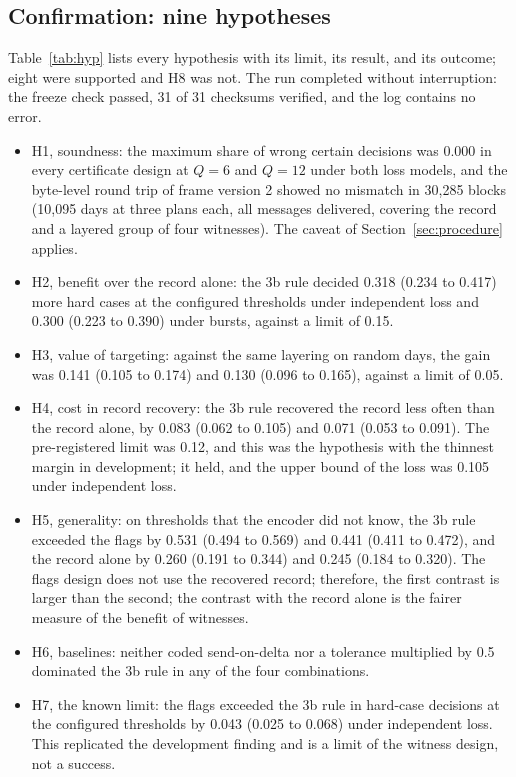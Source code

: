 \subsection{Confirmation: nine hypotheses}
\label{sec:confres}
Table~\ref{tab:hyp} lists every hypothesis with its limit, its result, and its outcome; eight were supported and H8 was not. The run completed without interruption: the freeze check passed, 31 of 31 checksums verified, and the log contains no error.
\begin{itemize}
  \item H1, soundness: the maximum share of wrong certain decisions was 0.000 in every certificate design at $Q = 6$ and $Q = 12$ under both loss models, and the byte-level round trip of frame version 2 showed no mismatch in 30,285 blocks (10,095 days at three plans each, all messages delivered, covering the record and a layered group of four witnesses). The caveat of Section~\ref{sec:procedure} applies.
  \item H2, benefit over the record alone: the 3b rule decided 0.318 (0.234 to 0.417) more hard cases at the configured thresholds under independent loss and 0.300 (0.223 to 0.390) under bursts, against a limit of 0.15.
  \item H3, value of targeting: against the same layering on random days, the gain was 0.141 (0.105 to 0.174) and 0.130 (0.096 to 0.165), against a limit of 0.05.
  \item H4, cost in record recovery: the 3b rule recovered the record less often than the record alone, by 0.083 (0.062 to 0.105) and 0.071 (0.053 to 0.091). The pre-registered limit was 0.12, and this was the hypothesis with the thinnest margin in development; it held, and the upper bound of the loss was 0.105 under independent loss.
  \item H5, generality: on thresholds that the encoder did not know, the 3b rule exceeded the flags by 0.531 (0.494 to 0.569) and 0.441 (0.411 to 0.472), and the record alone by 0.260 (0.191 to 0.344) and 0.245 (0.184 to 0.320). The flags design does not use the recovered record; therefore, the first contrast is larger than the second; the contrast with the record alone is the fairer measure of the benefit of witnesses.
  \item H6, baselines: neither coded send-on-delta nor a tolerance multiplied by 0.5 dominated the 3b rule in any of the four combinations.
  \item H7, the known limit: the flags exceeded the 3b rule in hard-case decisions at the configured thresholds by 0.043 (0.025 to 0.068) under independent loss. This replicated the development finding and is a limit of the witness design, not a success.

\end{itemize}
